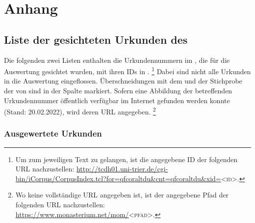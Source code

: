\chapter{Anhang}
\label{ch:anhang}

\section{Liste der gesichteten Urkunden des \CAO{}}
\label{sec:urkliste}

Die folgenden zwei Listen enthalten die Urkundennummern im \CAO{}, die
für die Auswertung gesichtet wurden, mit ihren IDs in \citet{cao-online}.%
%
	\footnote{Um zum jeweiligen Text zu gelangen, ist die angegebene ID der
	folgenden URL nachzustellen:
	\url{http://tcdh01.uni-trier.de/cgi-bin/iCorpus/CorpusIndex.tcl?for=qfcoraltdu&cnt=qfcoraltdu&xid=}\textsc{<id>}.}
%
Dabei sind nicht alle Urkunden in die Auswertung eingeflossen. Überschneidungen
mit dem \REM{} und der Stichprobe der 
von \citet{ksw3,ksw2} sind in der Spalte  markiert. Sofern eine
Abbildung der betreffenden Urkundennummer öffentlich verfügbar im Internet
gefunden werden konnte (Stand: 20.02.2022), wird deren URL angegeben.%
%
	\footnote{Wo keine vollständige URL angegeben ist, ist der angegebene
	Pfad der folgenden URL nachzustellen:
	\url{https://www.monasterium.net/mom/}\textsc{<pfad>}.}

\subsection{Ausgewertete Urkunden}
\label{subsec:ausgewurk}




